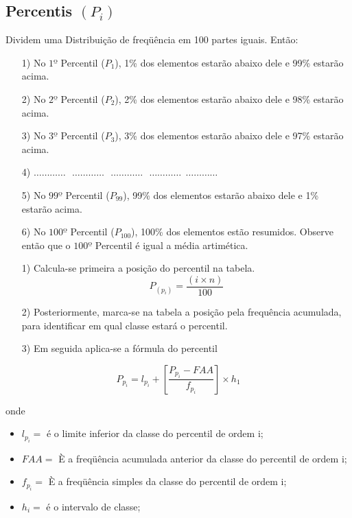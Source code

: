 \subsection{Percentis $(P_{i})$}

Dividem uma Distribuição de freqüência em 100 partes iguais. Então:


\begin{enumerate}
  \item[{1)}] No $1º$ Percentil ($P_{1}$), 1\% dos elementos estarão abaixo dele e 99\% estarão acima.
  \item[{2)}] No $2º$ Percentil ($P_{2}$), 2\% dos elementos estarão abaixo dele e 98\% estarão acima.
  \item[{3)}] No $3º$ Percentil ($P_{3}$), 3\% dos elementos estarão abaixo dele e 97\% estarão acima.
   \item[{4)}] $\ldots \ldots \ldots \ldots \ \ \  \ldots \ldots \ldots \ldots \ \ \  \ldots \ldots \ldots \ldots \ \ \  \ldots \ldots \ldots \ldots \ \ \ldots \ldots \ldots \ldots$
  \item[{5)}] No $99º$ Percentil ($P_{99}$), 99\% dos elementos estarão abaixo dele e 1\% estarão acima.
   \item[{6)}] No $100º$ Percentil ($P_{100}$), 100\% dos elementos estão resumidos. Observe então que o $100º$ Percentil é igual a média artimética.
\end{enumerate}



\begin{enumerate}
\item [{1)}]Calcula-se primeira a posição do percentil na tabela.
$$ P_{(p_{i})}=\frac{(i \times n)}{100}$$
\item [{2)}] Posteriormente, marca-se na tabela a posição pela frequência acumulada, para identificar em qual classe estará o percentil.
\item [{3)}] Em seguida aplica-se a fórmula do percentil
\end{enumerate}

\begin{equation}\label{}
    P_{p_{i}}= l_{p_{i}}+\left[\frac{P_{p_{i}}-FAA}{f_{p_{i}}}\right]\times h_{1}
\end{equation}

 onde

 \begin{itemize}
   \item $l_{p_{i}}=$ é o limite inferior da classe do percentil de ordem i;
   \item $FAA=$ È a freqüência acumulada anterior da classe do percentil de ordem i;
   \item $f_{p_{i}}=$ È a freqüência simples da classe do percentil de ordem i;
   \item $h_{i}=$ é o intervalo de classe;
 \end{itemize}



